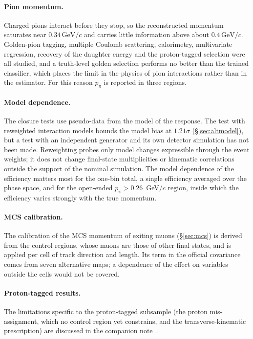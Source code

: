 \documentclass[11pt,a4paper]{article}
\newcommand{\GeVc}{\,\text{GeV}\!/c}
\begin{document}
\paragraph{Pion momentum.}
Charged pions interact before they stop, so the reconstructed momentum saturates near $0.34\GeVc$
and carries little information above about $0.4\GeVc$. Golden-pion tagging, multiple Coulomb
scattering, calorimetry, multivariate regression, recovery of the daughter energy and the
proton-tagged selection were all studied, and a truth-level golden selection performs no better than
the trained classifier, which places the limit in the physics of pion interactions rather than in
the estimator. For this reason $p_\pi$ is reported in three regions.

\paragraph{Model dependence.}
The closure tests use pseudo-data from the model of the response. The test with reweighted
interaction models bounds the model bias at $1.21\sigma$ (\S\ref{sec:altmodel}), but a test with an
independent generator and its own detector simulation has not been made. Reweighting probes only
model changes expressible through the event weights; it does not change final-state multiplicities or
kinematic correlations outside the support of the nominal simulation. The model dependence of
the efficiency matters most for the one-bin total, a single efficiency averaged over the phase space,
and for the open-ended $p_\pi>0.26$~GeV/$c$ region, inside which the efficiency varies strongly with
the true momentum.

\paragraph{MCS calibration.}
The calibration of the MCS momentum of exiting muons (\S\ref{sec:mcs}) is derived from the control regions, whose
muons are those of other final states, and is applied per cell of track direction and length. Its term in the
official covariance comes from seven alternative maps; a dependence of the effect on variables outside the cells
would not be covered.

\paragraph{Proton-tagged results.} The limitations specific to the proton-tagged subsample (the
proton mis-assignment, which no control region yet constrains, and the transverse-kinematic
prescription) are discussed in the companion note~\cite{pt_note}.
\end{document}
